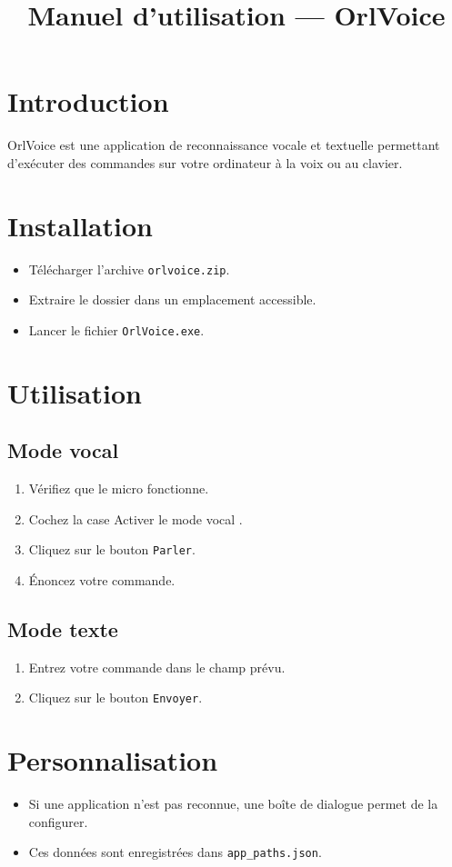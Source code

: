 \documentclass[a4paper,12pt]{article}
\title{Manuel d’utilisation — OrlVoice}
\author{}
\date{}
\begin{document}
	
	\maketitle
	
	\section*{Introduction}
	OrlVoice est une application de reconnaissance vocale et textuelle permettant d’exécuter des commandes sur votre ordinateur à la voix ou au clavier.
	
	\section{Installation}
	\begin{itemize}
		\item Télécharger l’archive \texttt{orlvoice.zip}.
		\item Extraire le dossier dans un emplacement accessible.
		\item Lancer le fichier \texttt{OrlVoice.exe}.
	\end{itemize}

	\section{Utilisation}
	\subsection{Mode vocal}
	\begin{enumerate}
		\item Vérifiez que le micro fonctionne.
		\item Cochez la case \og Activer le mode vocal \fg.
		\item Cliquez sur le bouton \texttt{Parler}.
		\item Énoncez votre commande.
	\end{enumerate}
	
	\subsection{Mode texte}
	\begin{enumerate}
		\item Entrez votre commande dans le champ prévu.
		\item Cliquez sur le bouton \texttt{Envoyer}.
	\end{enumerate}
	
	\section{Personnalisation}
	\begin{itemize}
		\item Si une application n’est pas reconnue, une boîte de dialogue permet de la configurer.
		\item Ces données sont enregistrées dans \texttt{app\_paths.json}.
	\end{itemize}
	
\end{document}
